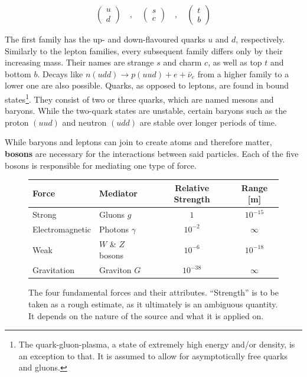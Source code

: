 \begin{equation*}
  \begin{pmatrix}
    u \\
    d
  \end{pmatrix}
  \quad , \quad
  \begin{pmatrix}
    s \\
    c
  \end{pmatrix}
  \quad , \quad
  \begin{pmatrix}
    t \\
    b
  \end{pmatrix}
\end{equation*}

The first family has the up- and down-flavoured quarks $u$ and $d$, respectively. Similarly to the lepton families, every subsequent family differs only by their increasing mass. Their names are strange $s$ and charm $c$, as well as top $t$ and bottom $b$. Decays like $n(udd) \rightarrow p(uud) + e + \bar{\nu}_e$ from a higher family to a lower one are also possible. Quarks, as opposed to leptons, are found in bound states\footnote{The quark-gluon-plasma, a state of extremely high energy and/or density, is an exception to that. It is assumed to allow for asymptotically free quarks and gluons.}. They consist of two or three quarks, which are named mesons and baryons. While the two-quark states are unstable, certain baryons such as the proton $(uud)$ and neutron $(udd)$ are stable over longer periods of time.


While baryons and leptons can join to create atoms and therefore matter, \textbf{bosons} are necessary for the interactions between said particles. Each of the five bosons is responsible for mediating one type of force.

\begin{figure}[!htb]
  \centering
  \begin{tabular}{|l|l|c|c|}
    \hline
    Force           & Mediator          & Relative Strength & Range [m]  \\ \hline
    Strong          & Gluons $g$        & $1$               & $10^{-15}$ \\
    Electromagnetic & Photons $\gamma$  & $10^{-2}$         & $\infty$   \\
    Weak            & $W$ \& $Z$ bosons & $10^{-6}$         & $10^{-18}$ \\
    Gravitation     & Graviton $G$      & $10^{-38}$        & $\infty$   \\
    \hline  
  \end{tabular}
  \caption{The four fundamental forces and their attributes. ``Strength'' is to be taken as a rough estimate, as it ultimately is an ambiguous quantity. It depends on the nature of the source and what it is applied on.}
  \label{tab:fundforces}
\end{figure}

